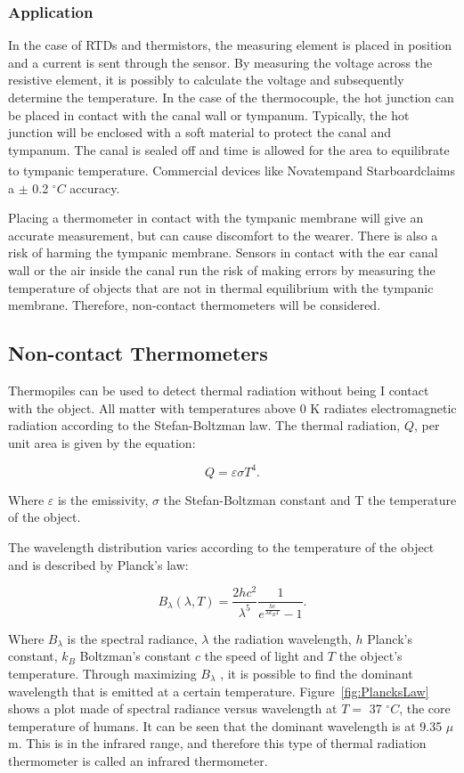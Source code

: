 \subsubsection{Application}
In the case of RTDs and thermistors, the measuring element is placed in position and a current is sent through the sensor. By measuring the voltage across the resistive element, it is possibly to calculate the voltage and subsequently determine the temperature. In the case of the thermocouple, the hot junction can be placed in contact with the canal wall or tympanum. Typically, the hot junction will be enclosed with a soft material to protect the canal and tympanum. The canal is sealed off and time is allowed for the area to equilibrate to tympanic temperature. Commercial devices like Novatemp\textsuperscript \textregistered and Starboard\textsuperscript \textregistered claims a $\pm$ 0.2 $^{\circ}C$ accuracy.

\medskip

Placing a thermometer in contact with the tympanic membrane will give an accurate measurement, but can cause discomfort to the wearer. There is also a risk of harming the tympanic membrane. Sensors in contact with the ear canal wall or the air inside the canal run the risk of making errors by measuring the temperature of objects that are not in thermal equilibrium with the tympanic membrane. Therefore, non-contact thermometers will be considered.

\subsection{Non-contact Thermometers}
Thermopiles can be used to detect thermal radiation without being I contact with the object. All matter with temperatures above 0 K radiates electromagnetic radiation according to the Stefan-Boltzman law. The thermal radiation, $Q$, per unit area is given by the equation:

$$Q=\varepsilon \sigma T^4.$$

Where $\varepsilon$ is the emissivity, $\sigma$ the Stefan-Boltzman constant and T the temperature of the object.

The wavelength distribution varies according to the temperature of the object and is described by Planck's law:

$$B_\lambda (\lambda ,T)=\frac{2hc^2}{\lambda ^5}\frac{1}{e^\frac{hc}{\lambda k_B T} -1}.$$
 
Where $B_\lambda$ is the spectral radiance, $\lambda$ the radiation wavelength, $h$ Planck's constant, $k_B$ Boltzman's constant $c$ the speed of light and $T$ the object's temperature. Through maximizing $B_\lambda$ , it is possible to find the dominant wavelength that is emitted at a certain temperature. Figure~\ref{fig:PlancksLaw} shows a plot made of spectral radiance versus wavelength at $T=$ 37 $^{\circ}C$, the core temperature of humans. It can be seen that the dominant wavelength is at 9.35 $\mu$m. This is in the infrared range, and therefore this type of thermal radiation thermometer is called an infrared thermometer.

